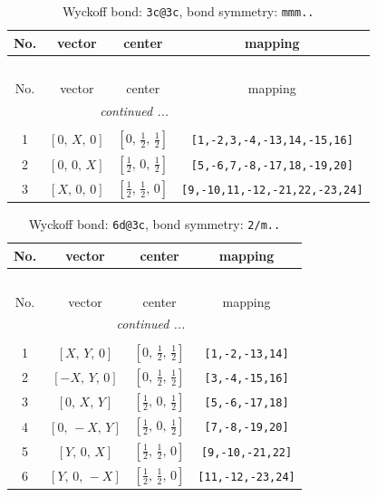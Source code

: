 \documentclass[fleqn,8pt]{jsarticle}
\begin{document}
\renewcommand{\arraystretch}{1.2}
\begin{longtable}{cccc}
\caption{Wyckoff bond: {\tt 3c@3c}, bond symmetry: {\tt mmm..}}
 \\
 \hline \hline
No. & vector & center & mapping \\ \hline \endfirsthead

\multicolumn{3}{l}{\tablename\ \thetable{}} \\
 \hline \hline
No. & vector & center & mapping \\ \hline \endhead

 \hline \hline
\multicolumn{3}{r}{\footnotesize\it continued ...} \\ \endfoot

 \hline \hline
\multicolumn{3}{r}{} \\ \endlastfoot

1 & $\left[ 0,\, X,\, 0 \right]$ & $\left[ 0,\, \frac{1}{2},\, \frac{1}{2} \right]$ & {\tt [1,-2,3,-4,-13,14,-15,16]} \\ \hline
2 & $\left[ 0,\, 0,\, X \right]$ & $\left[ \frac{1}{2},\, 0,\, \frac{1}{2} \right]$ & {\tt [5,-6,7,-8,-17,18,-19,20]} \\ \hline
3 & $\left[ X,\, 0,\, 0 \right]$ & $\left[ \frac{1}{2},\, \frac{1}{2},\, 0 \right]$ & {\tt [9,-10,11,-12,-21,22,-23,24]} \\
\end{longtable}
\renewcommand{\arraystretch}{1.2}
\begin{longtable}{cccc}
\caption{Wyckoff bond: {\tt 6d@3c}, bond symmetry: {\tt 2/m..}}
 \\
 \hline \hline
No. & vector & center & mapping \\ \hline \endfirsthead

\multicolumn{3}{l}{\tablename\ \thetable{}} \\
 \hline \hline
No. & vector & center & mapping \\ \hline \endhead

 \hline \hline
\multicolumn{3}{r}{\footnotesize\it continued ...} \\ \endfoot

 \hline \hline
\multicolumn{3}{r}{} \\ \endlastfoot

1 & $\left[ X,\, Y,\, 0 \right]$ & $\left[ 0,\, \frac{1}{2},\, \frac{1}{2} \right]$ & {\tt [1,-2,-13,14]} \\ \hline
2 & $\left[ - X,\, Y,\, 0 \right]$ & $\left[ 0,\, \frac{1}{2},\, \frac{1}{2} \right]$ & {\tt [3,-4,-15,16]} \\ \hline
3 & $\left[ 0,\, X,\, Y \right]$ & $\left[ \frac{1}{2},\, 0,\, \frac{1}{2} \right]$ & {\tt [5,-6,-17,18]} \\ \hline
4 & $\left[ 0,\, - X,\, Y \right]$ & $\left[ \frac{1}{2},\, 0,\, \frac{1}{2} \right]$ & {\tt [7,-8,-19,20]} \\ \hline
5 & $\left[ Y,\, 0,\, X \right]$ & $\left[ \frac{1}{2},\, \frac{1}{2},\, 0 \right]$ & {\tt [9,-10,-21,22]} \\ \hline
6 & $\left[ Y,\, 0,\, - X \right]$ & $\left[ \frac{1}{2},\, \frac{1}{2},\, 0 \right]$ & {\tt [11,-12,-23,24]} \\
\end{longtable}
\end{document}

